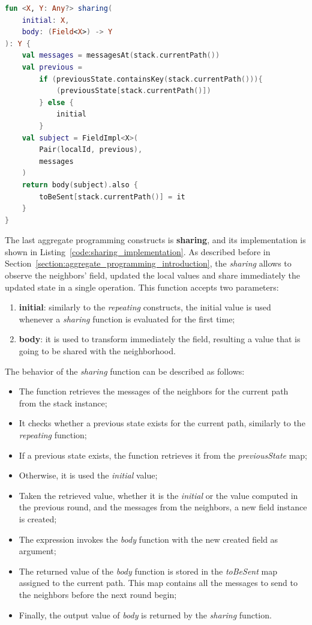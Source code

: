 \begin{lstlisting}[caption={Sharing implementation}, captionpos=b, language=Kotlin, label={code:sharing_implementation}]
fun <X, Y: Any?> sharing(
    initial: X,
    body: (Field<X>) -> Y
): Y {
    val messages = messagesAt(stack.currentPath())
    val previous = 
        if (previousState.containsKey(stack.currentPath())){
            (previousState[stack.currentPath()]) 
        } else {
            initial
        }
    val subject = FieldImpl<X>(
        Pair(localId, previous), 
        messages
    )
    return body(subject).also {
        toBeSent[stack.currentPath()] = it
    }
}
\end{lstlisting}
The last aggregate programming constructs is \textbf{sharing}, and its implementation is shown in Listing~\ref{code:sharing_implementation}. As described before in Section~\ref{section:aggregate_programming_introduction}, the \textit{sharing} allows to observe the
neighbors' field, updated the local values and share immediately the updated state in a
single operation.\newline
This function accepts two parameters:
\begin{enumerate}
    \item \textbf{initial}: similarly to the \textit{repeating} constructs, the initial value is used whenever a \textit{sharing} function is evaluated for the first time;
    \item \textbf{body}: it is used to transform immediately the field, resulting a value that is going to be shared with the neighborhood.
\end{enumerate}
The behavior of the \textit{sharing} function can be described as follows:
\begin{itemize}
    \item The function retrieves the messages of the neighbors for the current path from the stack instance;
    \item It checks whether a previous state exists for the current path, similarly to the \textit{repeating} function;
    \item If a previous state exists, the function retrieves it from the \textit{previousState} map;
    \item Otherwise, it is used the \textit{initial} value;
    \item Taken the retrieved value, whether it is the \textit{initial} or the value computed in the previous round, and the messages from the neighbors, a new field instance is created;
    \item The expression invokes the \textit{body} function with the new created field as argument;
    \item The returned value of the \textit{body} function is stored in the \textit{toBeSent} map assigned to the current path. This map contains all the messages to send to the neighbors before the next round begin;
    \item Finally, the output value of \textit{body} is returned by the \textit{sharing} function.
\end{itemize}

